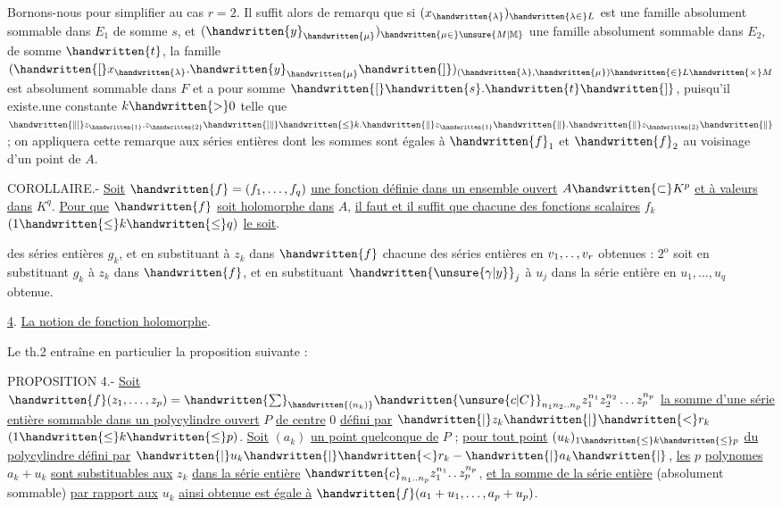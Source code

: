 Bornons-nous pour simplifier au cas $r=2$. Il suffit alors de remarqu que si $(x_{\handwritten{\lambda}})_{\handwritten{\lambda\in}L}$ est une famille absolument sommable dans $E_1$ de somme $s$, et $(\handwritten{y}_{\handwritten{\mu}})_{\handwritten{\mu\in}\unsure{M|\mathbb{M}}}$ une famille absolument sommable dans $E_2$, de somme $\handwritten{t}$, la famille $(\handwritten{[}x_{\handwritten{\lambda}}.\handwritten{y}_{\handwritten{\mu}}\handwritten{]})_{(\handwritten{\lambda},\handwritten{\mu})\handwritten{\in}L\handwritten{\times}M}$ est absolument sommable dans $F$ et a pour somme $\handwritten{[}\handwritten{s}.\handwritten{t}\handwritten{]}$, puisqu'il existe.une constante $k\handwritten{>}0$ telle que $\handwritten{\|[}z_{\handwritten{1}}.z_{\handwritten{2}}\handwritten{]\|}\handwritten{\leq}k.\handwritten{\|}z_{\handwritten{1}}\handwritten{\|}.\handwritten{\|}z_{\handwritten{2}}\handwritten{\|}$ ; on appliquera cette remarque aux séries entières dont les sommes sont égales à $\handwritten{f}_1$ et $\handwritten{f}_2$ au voisinage d'un point de $A$.

COROLLAIRE.- \uline{Soit} $\handwritten{f}=(f_1,\ldots,f_q)$ \uline{une fonction définie dans un ensemble ouvert} $A\handwritten{\subset}K^p$ \uline{et à valeurs dans} $K^q$. \uline{Pour que} $\handwritten{f}$ \uline{soit holomorphe dans} $A$, \uline{il faut et il suffit que chacune des fonctions scalaires} $f_k$ $(1\handwritten{\leq}k\handwritten{\leq}q)$ \uline{le soit}.

 des séries entières $g_k$, et en substituant à $z_k$ dans $\handwritten{f}$ chacune des séries entières en $v_1,\ldotp\ldotp,v_r$ obtenues : $2^{\mathrm{o}}$ soit en substituant $g_k$ à $z_k$ dans $\handwritten{f}$, et en substituant $\handwritten{\unsure{\gamma|y}}_j$ à $u_j$ dans la série entière en $u_1,\ldots,u_q$ obtenue.

\uline{4}. \uline{La notion de fonction holomorphe}.

Le th.2 entraîne en particulier la proposition suivante :

PROPOSITION 4.- \uline{Soit} $\handwritten{f}(z_1,\ldots,z_p)=\handwritten{\sum}_{\handwritten{(n_k)}}\handwritten{\unsure{c|C}}_{n_1n_2\ldotp\ldotp n_p}z_1^{n_1}z_2^{n_2}\ldots z_p^{n_p}$ \uline{la somme d'une série entière sommable dans un polycylindre ouvert} $P$ \uline{de centre} $0$ \uline{défini par} $\handwritten{|}z_k\handwritten{|}\handwritten{<}r_k$ $(1\handwritten{\leq}k\handwritten{\leq}p)$. \uline{Soit} $(a_k)$ \uline{un point quelconque de} $P$ ; \uline{pour tout point} $(u_k)_{1\handwritten{\leq}k\handwritten{\leq}p}$ \uline{du polycylindre défini par} $\handwritten{|}u_k\handwritten{|}\handwritten{<}r_k-\handwritten{|}a_k\handwritten{|}$, \uline{les} $p$ \uline{polynomes} $a_k+u_k$ \uline{sont substituables aux} $z_k$ \uline{dans la série entière} $\handwritten{c}_{n_1\ldotp\ldotp n_p}z_1^{n_1}\ldotp\ldotp z_p^{n_p}$, \uline{et la somme de la série entière} (absolument sommable) \uline{par rapport aux} $u_k$ \uline{ainsi obtenue est égale à} $\handwritten{f}(a_1+u_1,\ldots,a_p+u_p)$.

